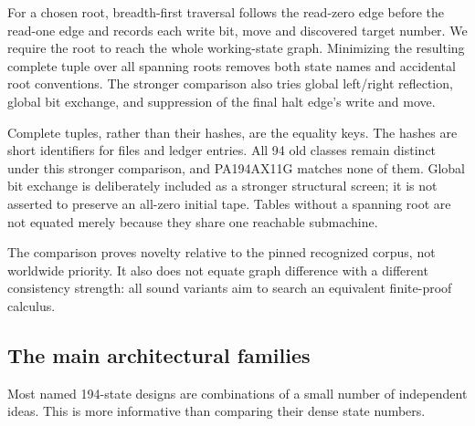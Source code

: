 \documentclass[11pt,letterpaper]{article}
\begin{document}
For a chosen root, breadth-first traversal follows the read-zero edge
before the read-one edge and records each write bit, move and discovered
target number. We require the root to reach the whole working-state
graph. Minimizing the resulting complete tuple over all spanning roots
removes both state names and accidental root conventions. The stronger
comparison also tries global left/right reflection, global bit exchange,
and suppression of the final halt edge's write and move.

Complete tuples, rather than their hashes, are the equality keys. The
hashes are short identifiers for files and ledger entries. All 94 old
classes remain distinct under this stronger comparison, and PA194AX11G
matches none of them. Global bit exchange is deliberately included as a
stronger structural screen; it is not asserted to preserve an all-zero
initial tape. Tables without a spanning root are not equated merely
because they share one reachable submachine.

The comparison proves novelty relative to the pinned recognized corpus,
not worldwide priority. It also does not equate graph difference with a
different consistency strength: all sound variants aim to search an
equivalent finite-proof calculus.

\subsection{The main architectural families}

Most named 194-state designs are combinations of a small number of
independent ideas. This is more informative than comparing their dense
state numbers.
\end{document}

